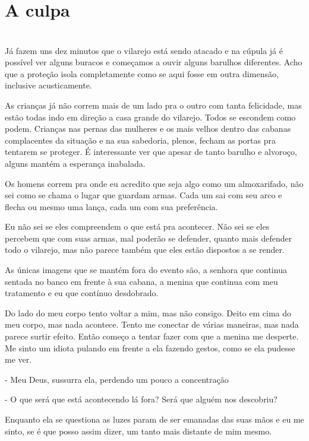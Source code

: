 
\newpage


\ifdefined\useChapters
\chapter{A culpa}
\else
\chapter{}
\fi
Já fazem uns dez minutos que o vilarejo está sendo atacado e na cúpula já é possível ver alguns buracos e começamos a ouvir alguns barulhos diferentes. Acho que a proteção isola completamente como se aqui fosse em outra dimensão, inclusive acusticamente.

As crianças já não correm mais de um lado pra o outro com tanta felicidade, mas estão todas indo em direção a casa grande do vilarejo. Todos se escondem como podem. Crianças nas pernas das mulheres e os mais velhos dentro das cabanas complacentes da situação e na sua sabedoria, plenos, fecham as portas pra tentarem se proteger. É interessante ver que apesar de tanto barulho e alvoroço, alguns mantém a esperança inabalada.

Os homens correm pra onde eu acredito que seja algo como um almoxarifado, não sei como se chama o lugar que guardam armas. Cada um sai com seu arco e flecha ou mesmo uma lança, cada um com sua preferência.

Eu não sei se eles compreendem o que está pra acontecer. Não sei se eles percebem que com suas armas, mal poderão se defender, quanto mais defender todo o vilarejo, mas não parece também que eles estão dispostos a se render.

As únicas imagens que se mantém fora do evento são, a senhora que continua sentada no banco em frente à sua cabana, a menina que continua com meu tratamento e eu que contínuo desdobrado.

Do lado do meu corpo tento voltar a mim, mas não consigo. Deito em cima do meu corpo, mas nada acontece. Tento me conectar de várias maneiras, mas nada parece surtir efeito. Então começo a tentar fazer com que a menina me desperte. Me sinto um idiota pulando em frente a ela fazendo gestos, como se ela pudesse me ver.

- Meu Deus, sussurra ela, perdendo um pouco a concentração

- O que será que está acontecendo lá fora? Será que alguém nos descobriu?

Enquanto ela se questiona as luzes param de ser emanadas das suas mãos e eu me sinto, se é que posso assim dizer, um tanto mais distante de mim mesmo.

